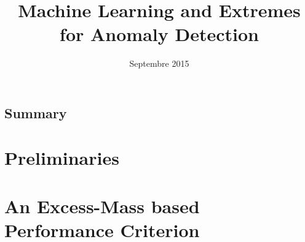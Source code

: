 \documentclass[draft]{ecsthesis}      %
\begin{document}
\begingroup
  \makeatletter
  \let\BR@bibitem\BRatbibitem
  \nobibliography*
\endgroup
\frontmatter
\title      {Machine Learning and Extremes for Anomaly Detection}
\date       {Septembre 2015}
\subject    {PhD Thesis}
\maketitle

\tableofcontents
\listoffigures
\listoftables
%
%
%
%
%
%
%

\mainmatter
\chapter{Summary}\label{chap:intro}


\part{Preliminaries}\label{part:background}


\part{An Excess-Mass based Performance Criterion}\label{part:struct}


\end{document}
